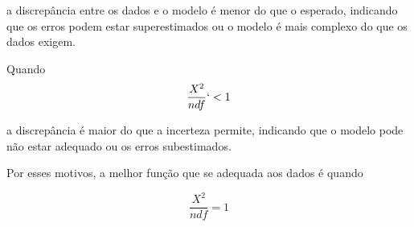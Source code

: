 \documentclass{article}
\begin{document}
{        a discrepância entre os dados e o modelo é menor do que o esperado, indicando que os erros podem estar superestimados ou o modelo é mais complexo do que os dados exigem.

        \vspace{1cm}

        Quando \[ \frac{X^2}{ndf} `< 1\] 
        
        \vspace{1cm}
        
        a discrepância é maior do que a incerteza permite, indicando que o modelo pode não estar adequado ou os erros subestimados.

        \vspace{2cm}

        Por esses motivos, a melhor função que se adequada aos dados é quando\vspace{1cm}
        
        \vspace{0.5cm}
        
        \[ \frac{X^2}{ndf} = 1\]

        
    }
    
  
\end{document}
